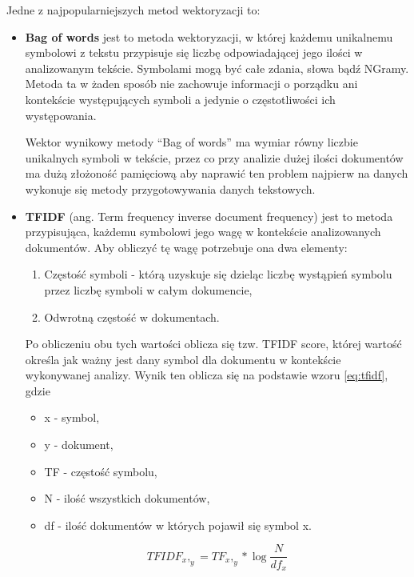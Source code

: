 Jedne z najpopularniejszych metod wektoryzacji to:
\begin{itemize}
    \item \textbf{Bag of words} jest to metoda wektoryzacji, w której każdemu unikalnemu symbolowi z tekstu przypisuje się liczbę 
    odpowiadającej jego ilości w analizowanym tekście. Symbolami mogą być całe zdania, słowa bądź NGramy. 
    Metoda ta w żaden sposób nie zachowuje informacji o porządku ani kontekście występujących symboli a jedynie o 
    częstotliwości ich występowania. 
    
    Wektor wynikowy metody ``Bag of words'' ma wymiar równy liczbie unikalnych symboli w tekście, przez co przy analizie dużej ilości 
    dokumentów ma dużą złożoność pamięciową aby naprawić ten problem najpierw na danych wykonuje się metody przygotowywania danych tekstowych.

    \item \textbf{TFIDF} (ang. Term frequency inverse document frequency) jest to metoda przypisująca, każdemu symbolowi 
    jego wagę w kontekście analizowanych dokumentów. Aby obliczyć tę wagę potrzebuje ona dwa elementy:
    \begin{enumerate}
        \item Częstość symboli - którą uzyskuje się dzieląc liczbę wystąpień symbolu przez liczbę symboli w całym dokumencie,
        \item Odwrotną częstość w dokumentach.
    \end{enumerate}
    Po obliczeniu obu tych wartości oblicza się tzw. TFIDF score, której wartość określa jak ważny jest dany symbol 
    dla dokumentu w kontekście wykonywanej analizy. Wynik ten oblicza się na podstawie wzoru \ref{eq:tfidf}, gdzie
    \begin{itemize}
        \item x - symbol,
        \item y - dokument,
        \item TF - częstość symbolu,
        \item N - ilość wszystkich dokumentów,
        \item df - ilość dokumentów w których pojawił się symbol x.
    \end{itemize}

    \begin{equation}
        \label{eq:tfidf}
        TFIDF_x,_y = TF_x,_y* \log{\frac{N}{df_x}}
    \end{equation}
\end{itemize}